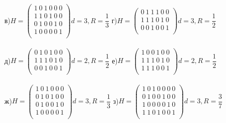 \documentclass[fontsize=12pt]{article}
\begin{document}
\noindent
в)$H = \begin{pmatrix}
1\ 0\ 1\ 0\ 0\ 0\\
1\ 1\ 0\ 1\ 0\ 0\\
0\ 1\ 0\ 0\ 1\ 0\\
1\ 0\ 0\ 0\ 0\ 1\\
\end{pmatrix} d = 3, R = \dfrac{1}{3}$
{ } { } { }  { } { } { }
г)$H = \begin{pmatrix}
0\ 1\ 1\ 1\ 0\ 0\\
1\ 1\ 1\ 0\ 1\ 0\\
0\ 0\ 1\ 0\ 0\ 1\\
\end{pmatrix} d = 3, R = \dfrac{1}{2}$\\\\

\noindent
д)$H = \begin{pmatrix}
0\ 1\ 0\ 1\ 0\ 0\\
1\ 1\ 1\ 0\ 1\ 0\\
0\ 0\ 1\ 0\ 0\ 1\\
\end{pmatrix} d = 2, R = \dfrac{1}{2}$
{ } { } { }  { } { } { }
е)$H = \begin{pmatrix}
1\ 0\ 0\ 1\ 0\ 0\\
1\ 1\ 1\ 0\ 1\ 0\\
1\ 1\ 1\ 0\ 0\ 1\\
\end{pmatrix} d = 2, R = \dfrac{1}{2}$\\\\

\noindent
ж)$H = \begin{pmatrix}
1\ 0\ 1\ 0\ 0\ 0\\
0\ 1\ 0\ 1\ 0\ 0\\
0\ 1\ 0\ 0\ 1\ 0\\
1\ 0\ 0\ 0\ 0\ 1\\
\end{pmatrix} d = 3, R = \dfrac{1}{3}$
{ } { } { }  { } { } { }
з)$H = \begin{pmatrix}
1\ 0\ 1\ 0\ 0\ 0\ 0\\
0\ 1\ 0\ 0\ 1\ 0\ 0\\
1\ 0\ 0\ 0\ 0\ 1\ 0\\
1\ 1\ 0\ 1\ 0\ 0\ 1\\
\end{pmatrix} d = 3, R = \dfrac{3}{7}$\\\\
\end{document}
